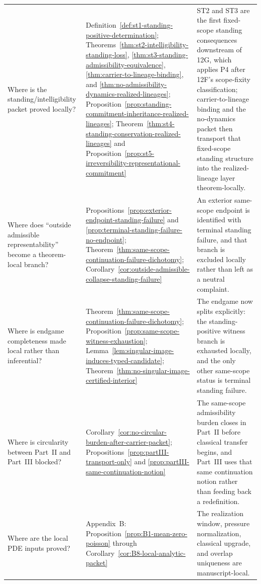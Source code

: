 \begin{tcolorbox}[title={Theorem map for a first audit pass (continued)}, colback=blue!2!white, colframe=blue!55!black, boxsep=1pt, left=2pt, right=2pt, top=2pt, bottom=2pt]
\begin{tabularx}{\textwidth}{@{}L{0.28\textwidth}L{0.32\textwidth}Y@{}}
Where is the standing/intelligibility packet proved locally? & Definition~\ref{def:st1-standing-positive-determination}; Theorems~\ref{thm:st2-intelligibility-standing-loss}, \ref{thm:st3-standing-admissibility-equivalence}, \ref{thm:carrier-to-lineage-binding}, and \ref{thm:no-admissibility-dynamics-realized-lineages}; Proposition~\ref{prop:standing-commitment-inheritance-realized-lineages}; Theorem~\ref{thm:st4-standing-conservation-realized-lineages} and Proposition~\ref{prop:st5-irreversibility-representational-commitment} & ST2 and ST3 are the first fixed-scope standing consequences downstream of 12G, which applies P4 after 12F's scope-fixity classification; carrier-to-lineage binding and the no-dynamics packet then transport that fixed-scope standing structure into the realized-lineage layer theorem-locally.\\
Where does ``outside admissible representability'' become a theorem-local branch? & Propositions~\ref{prop:exterior-endpoint-standing-failure} and \ref{prop:terminal-standing-failure-no-endpoint}; Theorem~\ref{thm:same-scope-continuation-failure-dichotomy}; Corollary~\ref{cor:outside-admissible-collapse-standing-failure} & An exterior same-scope endpoint is identified with terminal standing failure, and that branch is excluded locally rather than left as a neutral complaint.\\
Where is endgame completeness made local rather than inferential? & Theorem~\ref{thm:same-scope-continuation-failure-dichotomy}; Proposition~\ref{prop:same-scope-witness-exhaustion}; Lemma~\ref{lem:singular-image-induces-typed-candidate}; Theorem~\ref{thm:no-singular-image-certified-interior} & The endgame now splits explicitly: the standing-positive witness branch is exhausted locally, and the only other same-scope status is terminal standing failure.\\
Where is circularity between Part~II and Part~III blocked? & Corollary~\ref{cor:no-circular-burden-after-carrier-packet}; Propositions~\ref{prop:partIII-transport-only} and \ref{prop:partIII-same-continuation-notion} & The same-scope admissibility burden closes in Part~II before classical transfer begins, and Part~III uses that same continuation notion rather than feeding back a redefinition.\\
Where are the local PDE inputs proved? & Appendix~B: Proposition~\ref{prop:B1-mean-zero-poisson} through Corollary~\ref{cor:B8-local-analytic-packet} & The realization window, pressure normalization, classical upgrade, and overlap uniqueness are manuscript-local.\\

\end{tabularx}
\end{tcolorbox}
